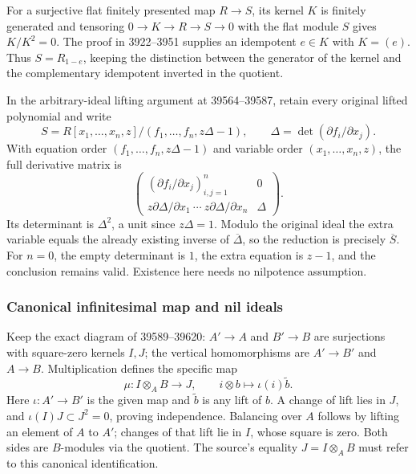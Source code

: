 For a surjective flat finitely presented map \(R\to S\), its kernel \(K\) is finitely generated and tensoring \(0\to K\to R\to S\to0\) with the flat module \(S\) gives \(K/K^2=0\). The proof in 3922--3951 supplies an idempotent \(e\in K\) with \(K=(e)\). Thus \(S=R_{1-e}\), keeping the distinction between the generator of the kernel and the complementary idempotent inverted in the quotient.

In the arbitrary-ideal lifting argument at 39564--39587, retain every original lifted polynomial and write \[
S=R[x_1,\ldots,x_n,z]/(f_1,\ldots,f_n,z\Delta-1),
\qquad \Delta=\det(\partial f_i/\partial x_j).
\] With equation order \((f_1,\ldots,f_n,z\Delta-1)\) and variable order \((x_1,\ldots,x_n,z)\), the full derivative matrix is \[
\begin{pmatrix}
(\partial f_i/\partial x_j)_{i,j=1}^n&0\\
z\partial\Delta/\partial x_1\ \cdots\ z\partial\Delta/\partial x_n&\Delta
\end{pmatrix}.
\] Its determinant is \(\Delta^2\), a unit since \(z\Delta=1\). Modulo the original ideal the extra variable equals the already existing inverse of \(\overline\Delta\), so the reduction is precisely \(\overline S\). For \(n=0\), the empty determinant is \(1\), the extra equation is \(z-1\), and the conclusion remains valid. Existence here needs no nilpotence assumption.

\subsubsection{Canonical infinitesimal map and nil ideals}\label{canonical-infinitesimal-map-and-nil-ideals}

Keep the exact diagram of 39589--39620: \(A'\to A\) and \(B'\to B\) are surjections with square-zero kernels \(I,J\); the vertical homomorphisms are \(A'\to B'\) and \(A\to B\). Multiplication defines the specific map \[
\mu:I\otimes_A B\longrightarrow J,\qquad
i\otimes b\longmapsto \iota(i)\widetilde b.
\] Here \(\iota:A'\to B'\) is the given map and \(\widetilde b\) is any lift of \(b\). A change of lift lies in \(J\), and \(\iota(I)J\subset J^2=0\), proving independence. Balancing over \(A\) follows by lifting an element of \(A\) to \(A'\); changes of that lift lie in \(I\), whose square is zero. Both sides are \(B\)-modules via the quotient. The source's equality \(J=I\otimes_A B\) must refer to this canonical identification.


